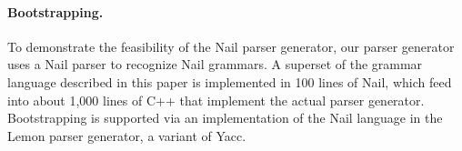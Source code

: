 \paragraph{Bootstrapping.}

To demonstrate the feasibility of the Nail parser generator, our parser
generator uses a Nail parser to recognize Nail grammars. A superset of the
grammar language described in this paper is implemented in 100 lines of Nail,
which feed into about 1,000 lines of C++ that implement the actual parser
generator. Bootstrapping is supported via an implementation of the Nail language
in the Lemon parser generator, a variant of Yacc.
